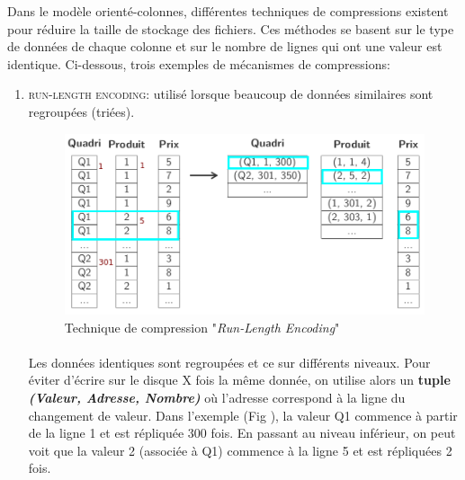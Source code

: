 \item{}
{}
{}


\item{}
{}
{}


\item{}
{\vrai}
{
Dans le modèle orienté-colonnes, différentes techniques de compressions existent pour réduire la taille de stockage des fichiers. Ces méthodes se basent sur le type de données de chaque colonne et sur le nombre de lignes qui ont une valeur est identique. Ci-dessous, trois exemples de mécanismes de compressions:
\begin{enumerate}\setlength{\itemsep}{.5em}
\item \textcolor{ltred}{\textsc{run-length encoding}}: utilisé lorsque beaucoup de données similaires sont regroupées (triées).
	\begin{figure}[h!]
	\center \includegraphics[scale=.35]{images/colonnes-compression-run}
	\caption{Technique de compression "\textit{Run-Length Encoding}" \cite{ref1}}\label{compression-run}
	\end{figure}
\paragraph{}
Les données identiques sont regroupées et ce sur différents niveaux. Pour éviter d'écrire sur le disque X fois la même donnée, on utilise alors un \textbf{tuple \textit{(Valeur, Adresse, Nombre)}} où l'adresse correspond à la ligne du changement de valeur. Dans l'exemple (Fig \cite{compression-run}), la valeur Q1 commence à partir de la ligne 1 et est répliquée 300 fois. En passant au niveau inférieur, on peut voit que la valeur 2 (associée à Q1) commence à la ligne 5 et est répliquées 2 fois. 

\end{enumerate}}
